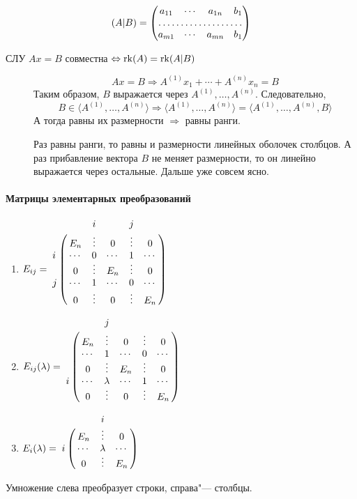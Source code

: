 \documentclass[12pt]{../../../notes}
\begin{document}
\begin{defn}\label{defn:extmtx}
  \[
    (A|B) = 
    \begin{pmatrix}
      a_{11} & \cdots & a_{1n} & b_1 \\
      \hdotsfor{4} \\
      a_{m1} & \cdots & a_{mn} & b_1 
    \end{pmatrix}
  \]
\end{defn}
\begin{thrm}\label{thrm:kronkap}
  СЛУ $Ax =B$ совместна $\Leftrightarrow \operatorname{rk} (A) = \operatorname{rk} (A|B)$
\end{thrm}
\begin{ittproof}
  \begin{description}
    \item[\circlearound{$\Rightarrow$}] 
      \[
        A x = B \Rightarrow A^{(1)} x_1 + \dotsb + A^{(n)} x_n = B
      \]
      Таким образом, $B$ выражается через $A^{(1)}, \dotsc , A^{(n)}$.
      Следовательно,
      \[
        B \in \langle A^{(1)}, \dotsc , A^{(n)}\rangle 
        \Rightarrow 
        \langle A^{(1)}, \dotsc , A^{(n)}\rangle  = \langle A^{(1)}, \dotsc , A^{(n)}, B\rangle 
      \]
      А тогда равны их размерности $\Rightarrow$ равны ранги.
    \item[\circlearound{$\Leftarrow$}] 
      Раз равны ранги, то равны и размерности линейных оболочек столбцов. А раз прибавление
      вектора $B$ не меняет размерности, то он линейно выражается через остальные. Дальше уже
      совсем ясно.
  \end{description}
\end{ittproof}

\paragraph{Матрицы элементарных преобразований}
\begin{enumerate}[I]
  \item $\displaystyle
      E_{ij} = \bordermatrix{
        ~ & ~      & i      & ~      & j      &        \cr
        ~ & E_n    & \vdots & 0      & \vdots & 0      \cr
        i & \cdots & 0      & \cdots & 1      & \cdots \cr
        ~ & 0      & \vdots & E_n    & \vdots & 0      \cr
        j & \cdots & 1      & \cdots & 0      & \cdots \cr
        ~ & 0      & \vdots & 0      & \vdots & E_n    \cr
      }
    $
  \item $\displaystyle
      E_{ij}(\lambda) = \bordermatrix{
        ~ & ~      & j      & ~      & ~      &        \cr
        ~ & E_n    & \vdots & 0      & \vdots & 0      \cr
        ~ & \cdots & 1      & \cdots & 0      & \cdots \cr
        ~ & 0      & \vdots & E_n    & \vdots & 0      \cr
        i & \cdots & \lambda& \cdots & 1      & \cdots \cr
        ~ & 0      & \vdots & 0      & \vdots & E_n    \cr
      }
    $
  \item $\displaystyle
      E_{i}(\lambda) = \bordermatrix{
        ~ & ~      & i       & ~      \cr
        ~ & E_n    & \vdots  & 0      \cr
        i & \cdots & \lambda & \cdots \cr
        ~ & 0      & \vdots  & E_n    \cr
      }
    $
\end{enumerate}
Умножение слева преобразует строки, справа"--- столбцы.
\end{document}

